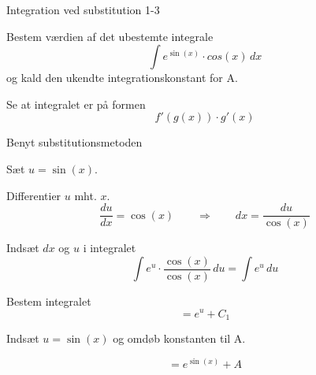 \documentclass{article}
\begin{document}
\begin{exercise}{Integration ved substitution 1-3}
	
	
	Bestem værdien af det ubestemte integrale
	\[
	\int e^{\sin(x)} \cdot cos(x) \, dx
	\]
	og kald den ukendte integrationskonstant for A.
	
	
	
	
	\hint
	
	Se at integralet er på formen
	\[
	f'(g(x)) \cdot g'(x)
	\]
	
	\hint
	
	Benyt substitutionsmetoden
	
	\hint
	
	Sæt $u=\sin(x)$.
	
	
	\hint
	
	Differentier $u$ mht. $x$.
	\[
	\frac{du}{dx} = \cos(x) \qquad	\Rightarrow \qquad dx = \frac{du}{\cos(x)}
	\]
	
	\hint
	
	Indsæt $dx$ og $u$ i integralet
	\[
	\int e^{u} \cdot \frac{\cos(x)}{\cos(x)} \, du = \int e^u \, du
	\]
	
	\hint
	
	Bestem integralet
	\[
	=  e^{u} + C_1
	\]
	
	\hint
	
	Indsæt $u = \sin(x)$ og omdøb konstanten  til A.
	
	\hint
	
	\[
	= e^{\sin(x)} + A
	\]
	
	
\end{exercise}

\newpage
\end{document}
